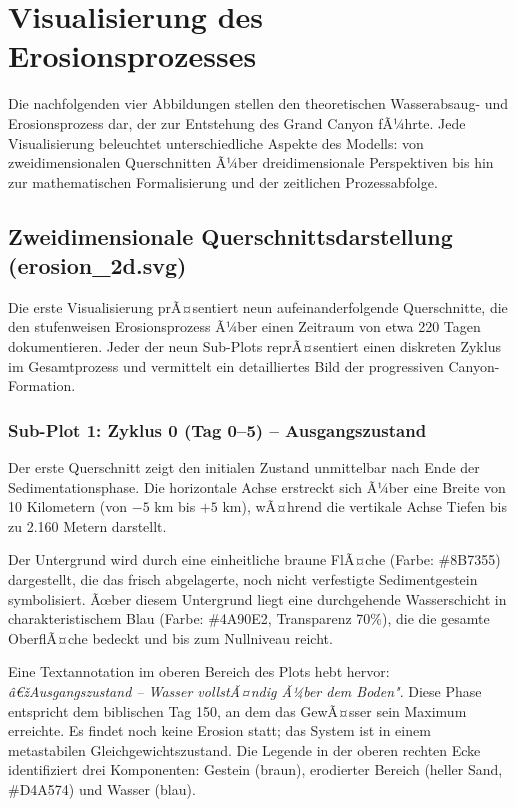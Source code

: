 ﻿\section{Visualisierung des Erosionsprozesses}

Die nachfolgenden vier Abbildungen stellen den theoretischen Wasserabsaug- und Erosionsprozess dar, der zur Entstehung des Grand Canyon fÃ¼hrte. Jede Visualisierung beleuchtet unterschiedliche Aspekte des Modells: von zweidimensionalen Querschnitten Ã¼ber dreidimensionale Perspektiven bis hin zur mathematischen Formalisierung und der zeitlichen Prozessabfolge.

\subsection{Zweidimensionale Querschnittsdarstellung (erosion\_2d.svg)}

Die erste Visualisierung prÃ¤sentiert neun aufeinanderfolgende Querschnitte, die den stufenweisen Erosionsprozess Ã¼ber einen Zeitraum von etwa 220 Tagen dokumentieren. Jeder der neun Sub-Plots reprÃ¤sentiert einen diskreten Zyklus im Gesamtprozess und vermittelt ein detailliertes Bild der progressiven Canyon-Formation.

\subsubsection*{Sub-Plot 1: Zyklus 0 (Tag 0--5) -- Ausgangszustand}

Der erste Querschnitt zeigt den initialen Zustand unmittelbar nach Ende der Sedimentationsphase. Die horizontale Achse erstreckt sich Ã¼ber eine Breite von 10 Kilometern (von $-5$ km bis $+5$ km), wÃ¤hrend die vertikale Achse Tiefen bis zu 2.160 Metern darstellt. 

Der Untergrund wird durch eine einheitliche braune FlÃ¤che (Farbe: \#8B7355) dargestellt, die das frisch abgelagerte, noch nicht verfestigte Sedimentgestein symbolisiert. Ãœber diesem Untergrund liegt eine durchgehende Wasserschicht in charakteristischem Blau (Farbe: \#4A90E2, Transparenz 70\%), die die gesamte OberflÃ¤che bedeckt und bis zum Nullniveau reicht.

Eine Textannotation im oberen Bereich des Plots hebt hervor: \textit{â€žAusgangszustand -- Wasser vollstÃ¤ndig Ã¼ber dem Boden"}. Diese Phase entspricht dem biblischen Tag 150, an dem das GewÃ¤sser sein Maximum erreichte. Es findet noch keine Erosion statt; das System ist in einem metastabilen Gleichgewichtszustand. Die Legende in der oberen rechten Ecke identifiziert drei Komponenten: Gestein (braun), erodierter Bereich (heller Sand, \#D4A574) und Wasser (blau).

